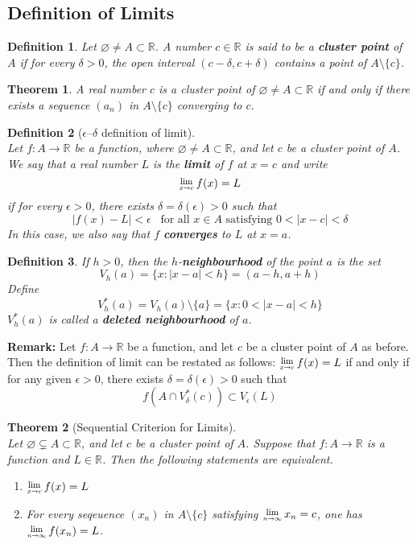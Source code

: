 \documentclass[12pt]{article}
\newcommand{\Lim}[1]{\raisebox{0.5ex}{\scalebox{0.8}{$\displaystyle \lim_{#1}\;$}}}
\newtheorem{definition}{Definition}[section]
\newtheorem{theorem}{Theorem}[section]
\theoremstyle{definition}
\begin{document}
\subsection{Definition of Limits}
\begin{definition}\normalfont Let $\varnothing\neq A\subset\mathbb{R}$. A number $c\in\mathbb{R}$ is said to be a \textbf{cluster point} of $A$ if for every $\delta>0$, the open interval $(c-\delta, c+\delta)$ contains a point of $A\setminus\{c\}$.
\end{definition}
\begin{theorem}\normalfont A real number $c$ is a cluster point of $\varnothing\neq A\subset \mathbb{R}$ if and only if there exists a sequence $(a_n)$ in $A\setminus\{c\}$ converging to $c$.
\end{theorem}
\begin{definition}[$\epsilon$--$\delta$ definition of limit]
\hfill\\\normalfont Let $f:A\to \mathbb{R}$ be a function, where $\varnothing\neq A\subset \mathbb{R}$, and let $c$ be a cluster point of $A$. We say that a real number $L$ is the \textbf{limit} of $f$ at $x=c$ and write
\[
\Lim{x\to c}f(x)=L
\]
if for every $\epsilon>0$, there exists $\delta = \delta(\epsilon)>0$ such that
\[
|f(x)-L|<\epsilon\;\;\;\text{for all }x\in A\text{ satisfying }0<|x-c|<\delta 
\]
In this case, we also say that $f$ \textbf{converges} to $L$ at $x=a$.
\end{definition}
\begin{definition}\normalfont If $h>0$, then the $h$-\textbf{neighbourhood} of the point $a$ is the set
\[
V_h(a)=\{x:|x-a|<h\}=(a-h,a+h)
\]
Define
\[
V_h^\ast(a)=V_h(a)\setminus \{a\}=\{x:0<|x-a|<h\}
\]
$V_h^\ast(a)$ is called a \textbf{deleted neighbourhood} of $a$.
\end{definition}
\textbf{Remark:} Let $f:A\to\mathbb{R}$ be a function, and let $c$ be a cluster point of $A$ as before. Then the definition of limit can be restated as follows: $\Lim{x\to c}f(x)=L$ if and only if for any given $\epsilon>0$, there exists $\delta=\delta(\epsilon)>0$ such that
\[
f(A\cap V_\delta^\ast(c))\subset V_\epsilon(L)
\]
\begin{theorem}[Sequential Criterion for Limits]
\hfill\\\normalfont Let $\varnothing\subsetneq A\subset\mathbb{R}$, and let $c$ be a cluster point of $A$. Suppose that $f:A\to \mathbb{R}$ is a function and $L\in\mathbb{R}$. Then the following statements are equivalent.
\begin{enumerate}
\item $\Lim{x\to c}f(x)=L$
\item For every seqeuence $(x_n)$ in $A\setminus\{c\}$ satisfying $\Lim{n\to\infty}x_n = c$, one has $\Lim{n\to\infty}f(x_n)=L$.
\end{enumerate}
\end{theorem}
\end{document}
